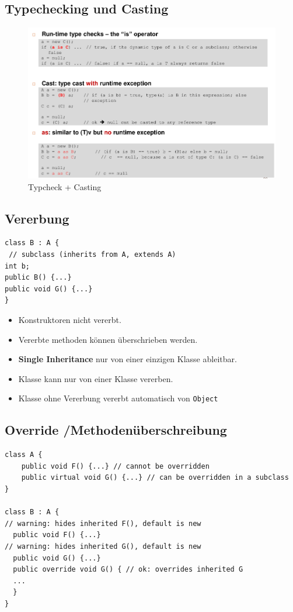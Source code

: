 \documentclass[a4paper,10pt]{scrartcl}
\begin{document}
\subsection{Typechecking und Casting}
\begin{figure}[h]
 \centering
 \includegraphics[scale=0.5]{./casting.png}
 \caption{Typcheck + Casting}
\end{figure}

\subsection{Vererbung}

\begin{lstlisting}[caption=Vererbungsbeispiel]
 class B : A {
 // subclass (inherits from A, extends A)
int b;
public B() {...}
public void G() {...}
}
\end{lstlisting}
\begin{itemize}
 \item Konstruktoren nicht vererbt.
 \item Vererbte methoden können überschrieben werden.
 \item \textbf{Single Inheritance} nur von einer einzigen Klasse ableitbar.
 \item Klasse kann nur von einer Klasse vererben.
 \item Klasse ohne Vererbung vererbt automatisch von \texttt{Object}
\end{itemize}

\subsection{Override /Methodenüberschreibung}
\begin{lstlisting}[caption=Override Beispiel]
 class A {
    public void F() {...} // cannot be overridden
    public virtual void G() {...} // can be overridden in a subclass
}

class B : A {
// warning: hides inherited F(), default is new
  public void F() {...}
// warning: hides inherited G(), default is new
  public void G() {...}
  public override void G() { // ok: overrides inherited G
  ...
  }
}

\end{lstlisting}
\end{document}
